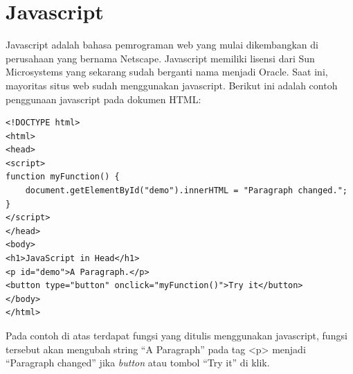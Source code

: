 \section{Javascript}
Javascript adalah bahasa pemrograman web yang mulai dikembangkan di perusahaan
yang bernama Netscape. Javascript memiliki lisensi dari Sun Microsystems yang sekarang sudah berganti nama 
menjadi Oracle. Saat ini, mayoritas situs web sudah menggunakan javascript.
Berikut ini adalah contoh penggunaan javascript pada dokumen HTML:
\lstset{
  language=HTML
}
\begin{lstlisting}
<!DOCTYPE html>
<html>
<head>
<script>
function myFunction() {
    document.getElementById("demo").innerHTML = "Paragraph changed.";
}
</script>
</head>
<body>
<h1>JavaScript in Head</h1>
<p id="demo">A Paragraph.</p>
<button type="button" onclick="myFunction()">Try it</button>
</body>
</html> 
\end{lstlisting}
Pada contoh di atas terdapat fungsi yang ditulis menggunakan javascript,
fungsi tersebut akan mengubah string ``A Paragraph'' pada tag <p> menjadi
``Paragraph changed'' jika \textit{button} atau tombol ``Try it'' di klik.

